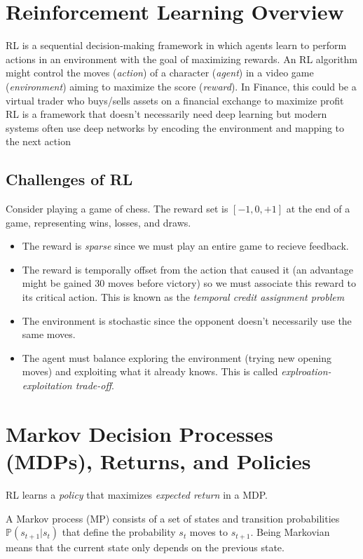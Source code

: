\documentclass[11pt]{article}
\newcommand{\Pbb}{\mathbb{P}}
\begin{document}
\section{Reinforcement Learning Overview}
RL is a sequential decision-making framework in which agents learn to perform actions in an environment with the goal of maximizing rewards. An RL algorithm might control the moves (\emph{action}) of a character (\emph{agent}) in a video game (\emph{environment}) aiming to maximize the score (\emph{reward}). In Finance, this could be a virtual trader who buys/sells assets on a financial exchange to maximize profit
RL is a framework that doesn't necessarily need deep learning but modern systems often use deep networks by encoding the environment and mapping to the next action
\subsection*{Challenges of RL}
Consider playing a game of chess. The reward set is $[-1, 0, +1]$ at the end of a game, representing wins, losses, and draws. 
\begin{itemize}
    \item The reward is \emph{sparse} since we must play an entire game to recieve feedback.
    \item The reward is temporally offset from the action that caused it (an advantage might be gained 30 moves before victory) so we must associate this reward to its critical action. This is known as the \emph{temporal credit assignment problem}
    \item The environment is stochastic since the opponent doesn't necessarily use the same moves.
    \item The agent must balance exploring the environment (trying new opening moves) and exploiting what it already knows. This is called \emph{explroation-exploitation trade-off}.
\end{itemize}

\section{Markov Decision Processes (MDPs), Returns, and Policies}
RL learns a \emph{policy} that maximizes \emph{expected return} in a MDP.

A Markov process (MP) consists of a set of states and transition probabilities $\Pbb (s_{t+1}|s_t)$ that define the probability $s_t$ moves to $s_{t+1}$. Being Markovian means that the current state only depends on the previous state.
\end{document}
